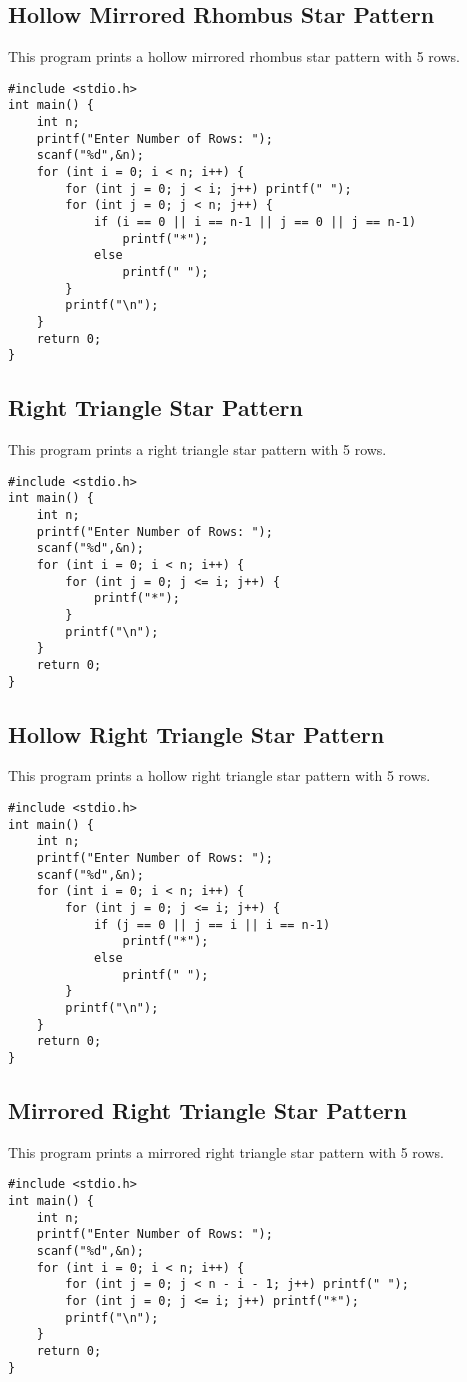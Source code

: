\documentclass[a4paper,12pt]{article}
\begin{document}
\subsection{Hollow Mirrored Rhombus Star Pattern}
This program prints a hollow mirrored rhombus star pattern with 5 rows.
\begin{lstlisting}[caption={Hollow Mirrored Rhombus Star Pattern}]
#include <stdio.h>
int main() {
    int n;
    printf("Enter Number of Rows: ");
    scanf("%d",&n);
    for (int i = 0; i < n; i++) {
        for (int j = 0; j < i; j++) printf(" ");
        for (int j = 0; j < n; j++) {
            if (i == 0 || i == n-1 || j == 0 || j == n-1)
                printf("*");
            else
                printf(" ");
        }
        printf("\n");
    }
    return 0;
}
\end{lstlisting}
\clearpage

\subsection{Right Triangle Star Pattern}
This program prints a right triangle star pattern with 5 rows.
\begin{lstlisting}[caption={Right Triangle Star Pattern}]
#include <stdio.h>
int main() {
    int n;
    printf("Enter Number of Rows: ");
    scanf("%d",&n);
    for (int i = 0; i < n; i++) {
        for (int j = 0; j <= i; j++) {
            printf("*");
        }
        printf("\n");
    }
    return 0;
}
\end{lstlisting}
\clearpage

\subsection{Hollow Right Triangle Star Pattern}
This program prints a hollow right triangle star pattern with 5 rows.
\begin{lstlisting}[caption={Hollow Right Triangle Star Pattern}]
#include <stdio.h>
int main() {
    int n;
    printf("Enter Number of Rows: ");
    scanf("%d",&n);
    for (int i = 0; i < n; i++) {
        for (int j = 0; j <= i; j++) {
            if (j == 0 || j == i || i == n-1)
                printf("*");
            else
                printf(" ");
        }
        printf("\n");
    }
    return 0;
}
\end{lstlisting}
\clearpage

\subsection{Mirrored Right Triangle Star Pattern}
This program prints a mirrored right triangle star pattern with 5 rows.
\begin{lstlisting}[caption={Mirrored Right Triangle Star Pattern}]
#include <stdio.h>
int main() {
    int n;
    printf("Enter Number of Rows: ");
    scanf("%d",&n);
    for (int i = 0; i < n; i++) {
        for (int j = 0; j < n - i - 1; j++) printf(" ");
        for (int j = 0; j <= i; j++) printf("*");
        printf("\n");
    }
    return 0;
}
\end{lstlisting}
\clearpage
\end{document}
